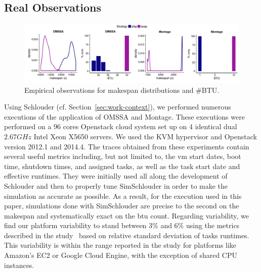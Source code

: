 \documentclass[]{llncs}
\begin{document}
\subsection{Real Observations}
\begin{figure}[bt]
	\centering
	\includegraphics[width=\textwidth]{gfx/real_plot.pdf}
	\caption[caption]{Empirical observations for makespan distributions and \#BTU.%
	  }
	\label{fig:realbrs}
\end{figure}

Using  Schlouder  (cf.  Section~\ref{sec:work-context}), we  performed  numerous
executions  of the  application  of  OMSSA and  Montage.  These executions  were
performed  on a  96 cores  Openstack cloud  system set  up on  4 identical  dual
$2.67GHz$ Intel  Xeon X5650 servers.  We used  the KVM hypervisor  and Openstack
version 2012.1  and 2014.4. The  traces obtained from these  experiments contain
several useful metrics  including, but not limited to, the  \ac{vm} start dates,
boot time, shutdown  times, and assigned tasks,  as well as the  task start date
and effective runtimes.
%
They were  initially used  all along  the development of  Schlouder and  then to
properly  tune SimSchlouder  in  order to  make the  simulation  as accurate  as
possible. As  a result, for the  execution used in this  paper, simulations done
with SimSchlouder are  precise to the second on the  makespan and systematically
exact on the \ac{btu} count.
%
Regarding variability, we find our platform variability to stand between 3\% and
6\% using the metrics described in the study~\cite{LeitnerC16} based on relative
standard  deviation of  tasks runtimes.   This variability  is within  the range
reported in  the study for platforms  like Amazon's EC2 or  Google Cloud Engine,
with the exception of shared CPU instances.
\end{document}
